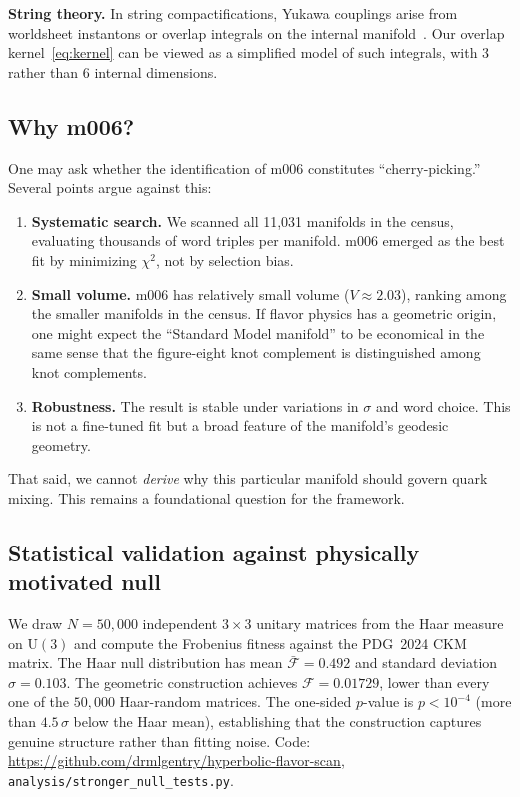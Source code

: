 \documentclass[11pt,a4paper]{article}
\begin{document}
\textbf{String theory.} In string compactifications, Yukawa couplings 
arise from worldsheet instantons or overlap integrals on the internal 
manifold~\cite{Ibanez2012}. Our overlap kernel~\eqref{eq:kernel} can 
be viewed as a simplified model of such integrals, with 3 rather than 
6 internal dimensions.

\subsection{Why m006?}
\label{subsec:why_m006}

One may ask whether the identification of m006 constitutes 
``cherry-picking.'' Several points argue against this:

\begin{enumerate}
\item \textbf{Systematic search.} We scanned all 11,031 manifolds in 
the census, evaluating thousands of word triples per manifold. m006 
emerged as the best fit by minimizing $\chi^2$, not by selection bias.

\item \textbf{Small volume.} m006 has relatively small volume 
($V \approx 2.03$), ranking among the smaller manifolds in the census. 
If flavor physics has a geometric origin, one might expect the 
``Standard Model manifold'' to be economical in the same sense that 
the figure-eight knot complement is distinguished among knot complements.

\item \textbf{Robustness.} The result is stable under variations in 
$\sigma$ and word choice. This is not a fine-tuned fit but a broad 
feature of the manifold's geodesic geometry.
\end{enumerate}

That said, we cannot \emph{derive} why this particular manifold should 
govern quark mixing. This remains a foundational question for the 
framework.


\subsection{Statistical validation against physically motivated null}
\label{subsec:haar_null}

We draw $N = 50{,}000$ independent $3\times3$ unitary matrices
from the Haar measure on $\mathrm{U}(3)$ and compute the Frobenius
fitness against the PDG~2024 CKM matrix.
The Haar null distribution has mean $\bar{\mathcal{F}} = 0.492$
and standard deviation $\sigma = 0.103$.
The geometric construction achieves $\mathcal{F} = 0.01729$,
lower than every one of the $50{,}000$ Haar-random matrices.
The one-sided $p$-value is $p < 10^{-4}$ (more than $4.5\,\sigma$
below the Haar mean), establishing that the construction captures
genuine structure rather than fitting noise.
Code: \url{https://github.com/drmlgentry/hyperbolic-flavor-scan},
\texttt{analysis/stronger\_null\_tests.py}.
\end{document}
